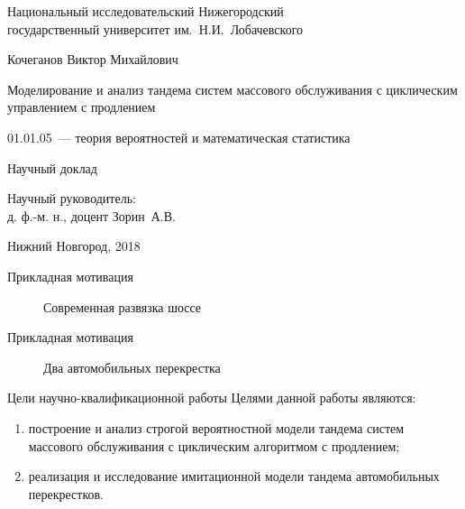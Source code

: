 \documentclass[10pt]{beamer}
\begin{document}
\begin{frame}
	
	\begin{center}
		{\small 
		Национальный исследовательский Нижегородский\\
		государственный университет им.~Н.И.~Лобачевского
		}
		\bigskip
		
 		{
Кочеганов Виктор Михайлович			
			\medskip
			
			{\large
Моделирование и анализ тандема систем массового обслуживания с циклическим
управлением с продлением
}
			
 		}
		\vfill
		
		{\small 01.01.05~--- теория вероятностей и математическая статистика}
		\medskip
		
		
		{\small Научный доклад
		}
		
	\end{center}
	
	\vfill
	
	
	\hfill 
	\begin{minipage}[h]{0.56\linewidth}\small
		Научный руководитель:\\
		д. ф.-м. н., доцент Зорин~А.В.
	\end{minipage}
	
	\vfill
	
	
	\centerline{\small Нижний Новгород, 2018}  
	
\end{frame}
  \begin{frame}{Прикладная мотивация}
      \begin{figure}[h]
    \centering
    \caption{Современная развязка шоссе}
    \label{VK:fig:1}
  \end{figure}
\end{frame}
  \begin{frame}{Прикладная мотивация}
      \begin{figure}[h]
    \centering
    \caption{Два автомобильных перекрестка}
    \label{VK:fig:1}
  \end{figure}
\end{frame}

\begin{frame}{Цели научно-квалификационной работы}
Целями данной работы являются:
\begin{enumerate}
    \item построение и анализ строгой вероятностной модели тандема систем массового обслуживания с циклическим алгоритмом с продлением;
    \item реализация и исследование имитационной модели тандема автомобильных перекрестков.
\end{enumerate}
\end{frame}
\end{document}
